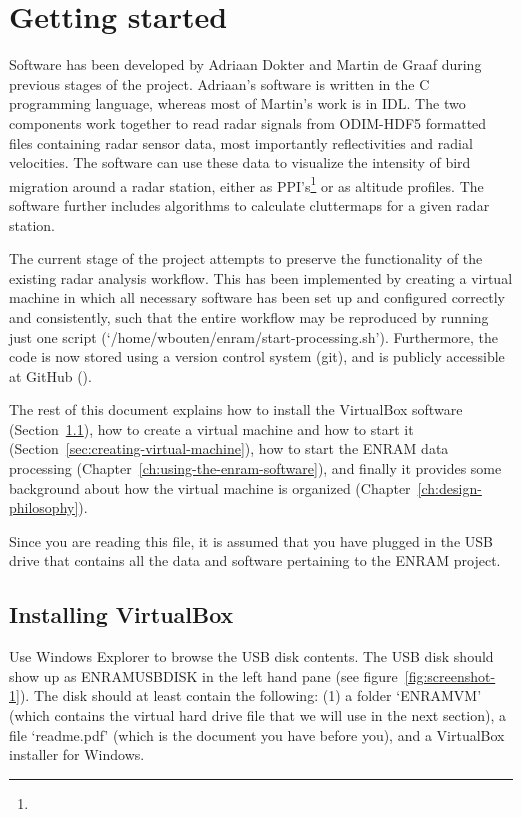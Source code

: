 \chapter{Getting started}

Software has been developed by Adriaan Dokter and Martin de Graaf during previous stages of the project. Adriaan's software is written in the C programming language, whereas most of Martin's work is in IDL. The two components work together to read radar signals from ODIM-HDF5 formatted files containing radar sensor data, most importantly reflectivities and radial velocities. The software can use these data to visualize the intensity of bird migration around a radar station, either as PPI's\footnote{} or as altitude profiles. The software further includes algorithms to calculate cluttermaps for a given radar station. 

The current stage of the project attempts to preserve the functionality of the existing radar analysis workflow. This has been implemented by creating a virtual machine in which all necessary software has been set up and configured correctly and consistently, such that the entire workflow may be reproduced by running just one script (`/home/wbouten/enram/start-processing.sh'). Furthermore, the code is now stored using a version control system (git), and is publicly accessible at GitHub ().

The rest of this document explains how to install the VirtualBox software (Section~\ref{sec:installing-virtualbox}), how to create a virtual machine and how to start it (Section~\ref{sec:creating-virtual-machine}), how to start the ENRAM data processing (Chapter~\ref{ch:using-the-enram-software}), and finally it provides some background about how the virtual machine is organized (Chapter~\ref{ch:design-philosophy}).

Since you are reading this file, it is assumed that you have plugged in the USB drive that contains all the data and software pertaining to the ENRAM project.

\clearpage

\section{Installing VirtualBox}
\label{sec:installing-virtualbox}

Use Windows Explorer to browse the USB disk contents. The USB disk should show up as ENRAMUSBDISK in the left hand pane (see figure~\ref{fig:screenshot-1}). The disk should at least contain the following: (1) a folder `ENRAMVM' (which contains the virtual hard drive file that we will use in the next section), a file `readme.pdf' (which is the document you have before you), and a VirtualBox installer for Windows.

